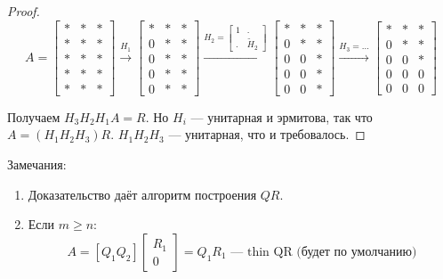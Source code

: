 \begin{proof}
    \[
        A = \begin{bmatrix}
            * & * & * \\
            * & * & * \\
            * & * & * \\
            * & * & * \\
            * & * & *
        \end{bmatrix}
        \xrightarrow{H_1}
        \begin{bmatrix}
            * & * & * \\
            0 & * & * \\
            0 & * & * \\
            0 & * & * \\
            0 & * & *
        \end{bmatrix}
        \xrightarrow{
            H_2 = \begin{bmatrix} 1 & . \\ . & \tilde{H}_2 \end{bmatrix}}
        \begin{bmatrix}
            * & * & * \\
            0 & * & * \\
            0 & 0 & * \\
            0 & 0 & * \\
            0 & 0 & *
        \end{bmatrix}
        \xrightarrow{H_3 = \dots}
        \begin{bmatrix}
            * & * & * \\
            0 & * & * \\
            0 & 0 & * \\
            0 & 0 & 0 \\
            0 & 0 & 0
        \end{bmatrix}
    \]

    Получаем $H_3 H_2 H_1 A = R$. Но $H_i$ --- унитарная и эрмитова, так что
    $A = (H_1 H_2 H_3) R$. $H_1 H_2 H_3$ --- унитарная, что и требовалось.
\end{proof}

Замечания:

\begin{enumerate}
    \item Доказательство даёт алгоритм построения $QR$.
    \item Если $m \ge n$:
        \[
            A = [Q_1 Q_2] \begin{bmatrix} R_1 \\ 0 \end{bmatrix}
            = Q_1 R_1 \text{ --- thin QR (будет по умолчанию)}
        \]
\end{enumerate}

